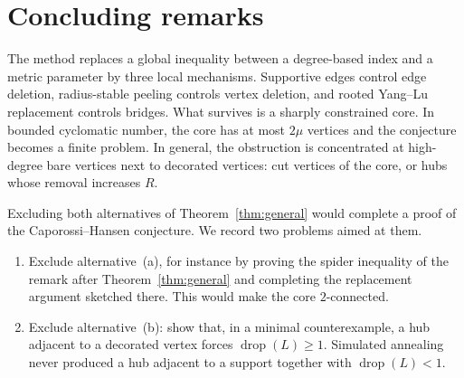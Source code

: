 \documentclass[11pt,a4paper]{article}
\theoremstyle{definition}
\newcommand{\drop}{\operatorname{drop}}
\begin{document}
\section{Concluding remarks}

The method replaces a global inequality between a degree-based index and a metric parameter by three local mechanisms. Supportive edges control edge deletion, radius-stable peeling controls vertex deletion, and rooted Yang--Lu replacement controls bridges. What survives is a sharply constrained core. In bounded cyclomatic number, the core has at most $2\mu$ vertices and the conjecture becomes a finite problem. In general, the obstruction is concentrated at high-degree bare vertices next to decorated vertices: cut vertices of the core, or hubs whose removal increases $R$.

Excluding both alternatives of Theorem~\ref{thm:general} would complete a proof of the Caporossi--Hansen conjecture. We record two problems aimed at them.
\begin{enumerate}
\item Exclude alternative~(a), for instance by proving the spider inequality of the remark after Theorem~\ref{thm:general} and completing the replacement argument sketched there. This would make the core $2$-connected.
\item Exclude alternative~(b): show that, in a minimal counterexample, a hub adjacent to a decorated vertex forces $\drop(L)\ge1$. Simulated annealing never produced a hub adjacent to a support together with $\drop(L)<1$.
\end{enumerate}
\end{document}
